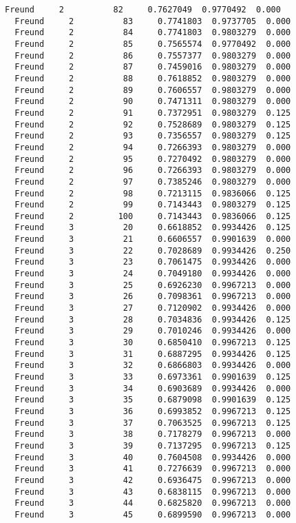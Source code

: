 \documentclass[11pt]{article}
\begin{document}
\begin{Verbatim}[commandchars=\\\{\}]
  Freund     2          82     0.7627049  0.9770492  0.000
  Freund     2          83     0.7741803  0.9737705  0.000
  Freund     2          84     0.7741803  0.9803279  0.000
  Freund     2          85     0.7565574  0.9770492  0.000
  Freund     2          86     0.7557377  0.9803279  0.000
  Freund     2          87     0.7459016  0.9803279  0.000
  Freund     2          88     0.7618852  0.9803279  0.000
  Freund     2          89     0.7606557  0.9803279  0.000
  Freund     2          90     0.7471311  0.9803279  0.000
  Freund     2          91     0.7372951  0.9803279  0.125
  Freund     2          92     0.7528689  0.9803279  0.125
  Freund     2          93     0.7356557  0.9803279  0.125
  Freund     2          94     0.7266393  0.9803279  0.000
  Freund     2          95     0.7270492  0.9803279  0.000
  Freund     2          96     0.7266393  0.9803279  0.000
  Freund     2          97     0.7385246  0.9803279  0.000
  Freund     2          98     0.7213115  0.9836066  0.125
  Freund     2          99     0.7143443  0.9803279  0.125
  Freund     2         100     0.7143443  0.9836066  0.125
  Freund     3          20     0.6618852  0.9934426  0.125
  Freund     3          21     0.6606557  0.9901639  0.000
  Freund     3          22     0.7028689  0.9934426  0.250
  Freund     3          23     0.7061475  0.9934426  0.000
  Freund     3          24     0.7049180  0.9934426  0.000
  Freund     3          25     0.6926230  0.9967213  0.000
  Freund     3          26     0.7098361  0.9967213  0.000
  Freund     3          27     0.7120902  0.9934426  0.000
  Freund     3          28     0.7034836  0.9934426  0.125
  Freund     3          29     0.7010246  0.9934426  0.000
  Freund     3          30     0.6850410  0.9967213  0.125
  Freund     3          31     0.6887295  0.9934426  0.125
  Freund     3          32     0.6866803  0.9934426  0.000
  Freund     3          33     0.6973361  0.9901639  0.125
  Freund     3          34     0.6903689  0.9934426  0.000
  Freund     3          35     0.6879098  0.9901639  0.125
  Freund     3          36     0.6993852  0.9967213  0.125
  Freund     3          37     0.7063525  0.9967213  0.125
  Freund     3          38     0.7178279  0.9967213  0.000
  Freund     3          39     0.7137295  0.9967213  0.125
  Freund     3          40     0.7604508  0.9934426  0.000
  Freund     3          41     0.7276639  0.9967213  0.000
  Freund     3          42     0.6936475  0.9967213  0.000
  Freund     3          43     0.6838115  0.9967213  0.000
  Freund     3          44     0.6825820  0.9967213  0.000
  Freund     3          45     0.6899590  0.9967213  0.000

\end{Verbatim}
\end{document}
